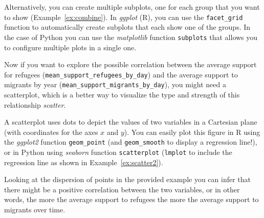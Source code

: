 
Alternatively, you can create multiple subplots, one for each group that you want to show (Example~\ref{ex:combine}).
In \emph{ggplot} (R), you can use the \texttt{facet\_grid} function to automatically create subplots that each show one of the groups. In the case of Python you can use the \emph{matplotlib} function \texttt{subplots} that allows you to configure multiple plots in a single one.


Now if you want to explore the possible correlation between the average support for refugees (\texttt{mean\_support\_refugees\_by\_day}) and the average support to migrants by year (\texttt{mean\_support\_migrants\_by\_day}), you might need a scatterplot, which is a better way to visualize the type and strength of this relationship \emph{scatter}.


A scatterplot uses dots to depict the values of two variables in a Cartesian plane (with coordinates for the axes $x$ and $y$). You can easily plot this figure in R using the \emph{ggplot2} function \texttt{geom\_point} (and \texttt{geom\_smooth} to display a regression line!), or in Python using \emph{seaborn} function \texttt{scatterplot} (\texttt{lmplot} to include the regression line as shown in Example~\ref{ex:scatter2}).




Looking at the dispersion of points in the provided example you can infer that there might be a positive correlation between the two variables, or in other words, the more the average support to refugees the more the average support to migrants over time.

